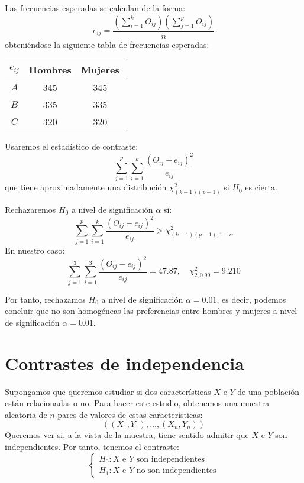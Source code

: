 \begin{example}
    Las frecuencias esperadas se calculan de la forma:
    $$e_{ij} = \frac{(\sum_{i=1}^k O_{ij})(\sum_{j=1}^p O_{ij})}{n}$$
    obteniéndose la siguiente tabla de frecuencias esperadas:
    \begin{center}
        \begin{tabular}{| c | c c |}
            \hline
            $e_{ij}$ & Hombres & Mujeres \\
            \hline
            $A$      & 345     & 345     \\
            $B$      & 335     & 335     \\
            $C$      & 320     & 320     \\
            \hline
        \end{tabular}
    \end{center}

    Usaremos el estadístico de contraste:
    $$\sum_{j=1}^p \sum_{i=1}^k \frac{(O_{ij}-e_{ij})^2}{e_{ij}}$$
    que tiene aproximadamente una distribución $\chi^2_{(k-1)(p-1)}$ si $H_0$ es cierta.

    Rechazaremos $H_0$ a nivel de significación $\alpha$ si:
    $$\sum_{j=1}^p \sum_{i=1}^k \frac{(O_{ij}-e_{ij})^2}{e_{ij}} > \chi^2_{(k-1)(p-1), 1-\alpha}$$
    En nuestro caso:
    $$\sum_{j=1}^3 \sum_{i=1}^3 \frac{(O_{ij}-e_{ij})^2}{e_{ij}} = 47.87, \quad \chi^2_{2, 0.99} = 9.210$$

    Por tanto, rechazamos $H_0$ a nivel de significación $\alpha = 0.01$, es decir, podemos concluir que no son homogéneas las preferencias entre hombres y mujeres a nivel de significación $\alpha = 0.01$.
\end{example}


\section{Contrastes de independencia}
Supongamos que queremos estudiar si dos características $X$ e $Y$ de una población están relacionadas o no.
Para hacer este estudio, obtenemos una muestra aleatoria de $n$ pares de valores de estas características:
$$((X_1, Y_1), \dots, (X_n, Y_n))$$
Queremos ver si, a la vista de la muestra, tiene sentido admitir que $X$ e $Y$ son independientes.
Por tanto, tenemos el contraste:
$$\begin{cases}
        H_0: X \text{ e } Y \text{ son independientes} \\
        H_1: X \text{ e } Y \text{ no son independientes}
    \end{cases}$$

